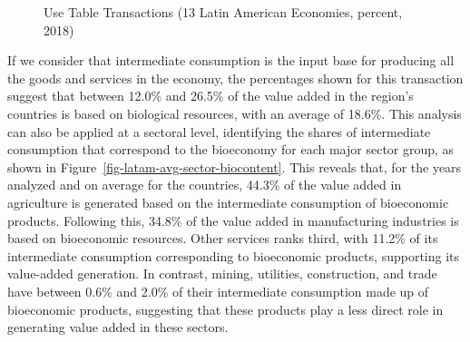 \documentclass[
  letterpaper,
  DIV=11,
  numbers=noendperiod]{scrartcl}
\begin{document}
\begin{figure}
\begin{minipage}{\linewidth}
{}


\end{minipage}%
\newline
\begin{minipage}{\linewidth}



\end{minipage}%

\caption{\label{fig-latam-use}Use Table Transactions (13 Latin American
Economies, percent, 2018)}

\end{figure}%

If we consider that intermediate consumption is the input base for
producing all the goods and services in the economy, the percentages
shown for this transaction suggest that between 12.0\% and 26.5\% of the
value added in the region's countries is based on biological resources,
with an average of 18.6\%. This analysis can also be applied at a
sectoral level, identifying the shares of intermediate consumption that
correspond to the bioeconomy for each major sector group, as shown in
Figure~\ref{fig-latam-avg-sector-biocontent}. This reveals that, for the
years analyzed and on average for the countries, 44.3\% of the value
added in agriculture is generated based on the intermediate consumption
of bioeconomic products. Following this, 34.8\% of the value added in
manufacturing industries is based on bioeconomic resources. Other
services ranks third, with 11.2\% of its intermediate consumption
corresponding to bioeconomic products, supporting its value-added
generation. In contrast, mining, utilities, construction, and trade have
between 0.6\% and 2.0\% of their intermediate consumption made up of
bioeconomic products, suggesting that these products play a less direct
role in generating value added in these sectors.
\end{document}
